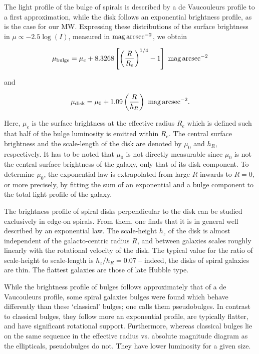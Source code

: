 \documentclass[a4paper,11pt]{article}
\begin{document}
{\noindent}The light profile of the bulge of spirals is described by a de Vaucouleurs profile to a first approximation, while the disk follows an exponential brightness profile, as is the case for our MW. Expressing these distributions of the surface brightness in $\mu\propto-2.5\log(I)$, measured in ${\rm mag\,arcsec^{-2}}$, we obtain

\begin{align*}
    \mu_\mathrm{bulge} = \mu_e + 8.3268\left[\left(\frac{R}{R_e}\right)^{1/4}-1\right] ~ {\rm mag\,arcsec^{-2}}
\end{align*}

{\noindent}and

\begin{align*}
    \mu_\mathrm{disk} = \mu_0 + 1.09\left(\frac{R}{h_R}\right) ~ {\rm mag\,arcsec^{-2}}.
\end{align*}

{\noindent}Here, $\mu_e$ is the surface brightness at the effective radius $R_e$ which is defined such that half of the bulge luminosity is emitted within $R_e$. The central surface brightness and the scale-length of the disk are denoted by $\mu_0$ and $h_R$, respectively. It has to be noted that $\mu_0$ is not directly measurable since $\mu_0$ is not the central surface brightness of the galaxy, only that of its disk component. To determine $\mu_0$, the exponential law is extrapolated from large $R$ inwards to $R=0$, or more precisely, by fitting the sum of an exponential and a bulge component to the total light profile of the galaxy.

{\noindent}The brightness profile of spiral disks perpendicular to the disk can be studied exclusively in edge-on spirals. From them, one finds that it is in general well described by an exponential law. The scale-height $h_z$ of the disk is almost independent of the galacto-centric radius $R$, and between galaxies scales roughly linearly with the rotational velocity of the disk. The typical value for the ratio of scale-height to scale-length is $h_z/h_R=0.07$ -- indeed, the disks of spiral galaxies are thin. The flattest galaxies are those of late Hubble type.

{\noindent}While the brightness profile of bulges follows approximately that of a de Vaucouleurs profile, some spiral galaxies bulges were found which behave differently than these `classical' bulges; one calls them pseudobulges. In contrast to classical bulges, they follow more an exponential profile, are typically flatter, and have significant rotational support. Furthermore, whereas classical bulges lie on the same sequence in the effective radius vs. absolute magnitude diagram as the ellipticals, pseudobulges do not. They have lower luminosity for a given size.
\end{document}
